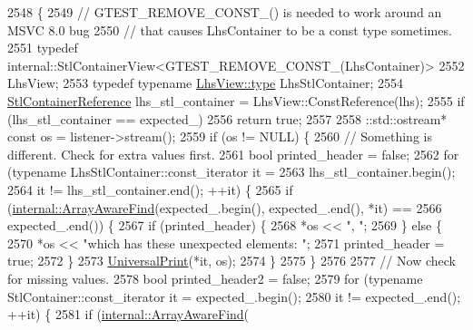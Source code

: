 \begin{DoxyCode}
2548                                                             \{
2549     \textcolor{comment}{// GTEST\_REMOVE\_CONST\_() is needed to work around an MSVC 8.0 bug}
2550     \textcolor{comment}{// that causes LhsContainer to be a const type sometimes.}
2551     \textcolor{keyword}{typedef} internal::StlContainerView<GTEST\_REMOVE\_CONST\_(LhsContainer)>
2552         LhsView;
2553     \textcolor{keyword}{typedef} \textcolor{keyword}{typename} \hyperlink{namespaceupload_a4fc56f0dd6613be15c3c4dc3af3619ce}{LhsView::type} LhsStlContainer;
2554     \hyperlink{classtesting_1_1internal_1_1ContainerEqMatcher_aaaeaacf0c557fe701a83e108d47edb23}{StlContainerReference} lhs\_stl\_container = LhsView::ConstReference(lhs);
2555     \textcolor{keywordflow}{if} (lhs\_stl\_container == expected\_)
2556       \textcolor{keywordflow}{return} \textcolor{keyword}{true};
2557 
2558     ::std::ostream* \textcolor{keyword}{const} os = listener->stream();
2559     \textcolor{keywordflow}{if} (os != NULL) \{
2560       \textcolor{comment}{// Something is different. Check for extra values first.}
2561       \textcolor{keywordtype}{bool} printed\_header = \textcolor{keyword}{false};
2562       \textcolor{keywordflow}{for} (\textcolor{keyword}{typename} LhsStlContainer::const\_iterator it =
2563                lhs\_stl\_container.begin();
2564            it != lhs\_stl\_container.end(); ++it) \{
2565         \textcolor{keywordflow}{if} (\hyperlink{namespacetesting_1_1internal_a94a857fe6ff32cf4fdc4769a4071f239}{internal::ArrayAwareFind}(expected\_.begin(), expected\_.end(), *it) ==
2566             expected\_.end()) \{
2567           \textcolor{keywordflow}{if} (printed\_header) \{
2568             *os << \textcolor{stringliteral}{", "};
2569           \} \textcolor{keywordflow}{else} \{
2570             *os << \textcolor{stringliteral}{"which has these unexpected elements: "};
2571             printed\_header = \textcolor{keyword}{true};
2572           \}
2573           \hyperlink{namespacetesting_1_1internal_ad121a890bddf866e59605d1a0198dada}{UniversalPrint}(*it, os);
2574         \}
2575       \}
2576 
2577       \textcolor{comment}{// Now check for missing values.}
2578       \textcolor{keywordtype}{bool} printed\_header2 = \textcolor{keyword}{false};
2579       \textcolor{keywordflow}{for} (\textcolor{keyword}{typename} StlContainer::const\_iterator it = expected\_.begin();
2580            it != expected\_.end(); ++it) \{
2581         \textcolor{keywordflow}{if} (\hyperlink{namespacetesting_1_1internal_a94a857fe6ff32cf4fdc4769a4071f239}{internal::ArrayAwareFind}(

\end{DoxyCode}

